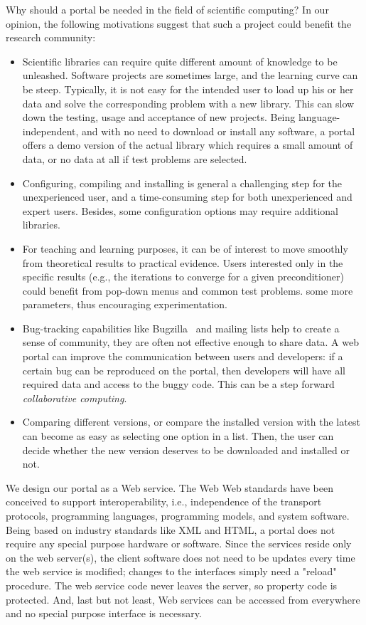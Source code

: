 \documentclass[11pt,relax]{SANDreport}
\begin{document}
Why should a portal be needed in the field of scientific computing? In our
opinion, the following motivations suggest that such a project could benefit
the research community:
\begin{itemize}
\item Scientific libraries can require quite different amount
of knowledge to be unleashed. Software projects are sometimes large, and the
learning curve can be steep. Typically, it is not easy for the intended user
to load up his or her data and solve the corresponding problem with a new
library. This can slow down the testing, usage and acceptance of new 
projects. Being language-independent, and with no need to download or install
any software, a portal offers a demo version of the actual library which
requires a small amount of data, or no data at all if test problems are
selected.
%
\item Configuring, compiling and installing is general a challenging step for
the unexperienced user, and a time-consuming step for both unexperienced and
expert users. Besides, some configuration options may require additional
libraries.
%
\item For teaching and learning purposes, it can be of interest to move
smoothly from theoretical results to practical evidence.
Users interested only in the specific results 
(e.g., the iterations to converge for a given preconditioner) could benefit
from pop-down menus and common test problems.
some more parameters, thus encouraging experimentation.
%
\item Bug-tracking capabilities like Bugzilla~\cite{bugzilla} and
mailing lists help to create a sense of community, they are often not
effective enough to share data. A web portal can improve the communication
between users and developers: if a certain bug can be reproduced on the
portal, then developers will have all required data and access to the buggy
code. This can be a step forward {\sl collaborative computing}.
\item Comparing different versions, or compare the installed version with the
latest can become as easy as selecting one option in a list. Then, the user
can decide whether the new version deserves to be downloaded and installed or
not.
\end{itemize}
We design our portal as a Web service. The Web Web standards have been
conceived to support interoperability, i.e., independence of the transport
protocols, programming languages, programming models, and system software.
Being based on industry standards like XML and HTML, a portal does not require
any special purpose hardware or software.  Since the services reside only on
the web server(s), the client software does not need to be updates every time
the web service is modified; changes to the interfaces simply need a "reload"
procedure.  The web service code never leaves the server, so property code is
protected. And, last but not least, Web services can be accessed from
everywhere and no special purpose interface is necessary.
\end{document}
